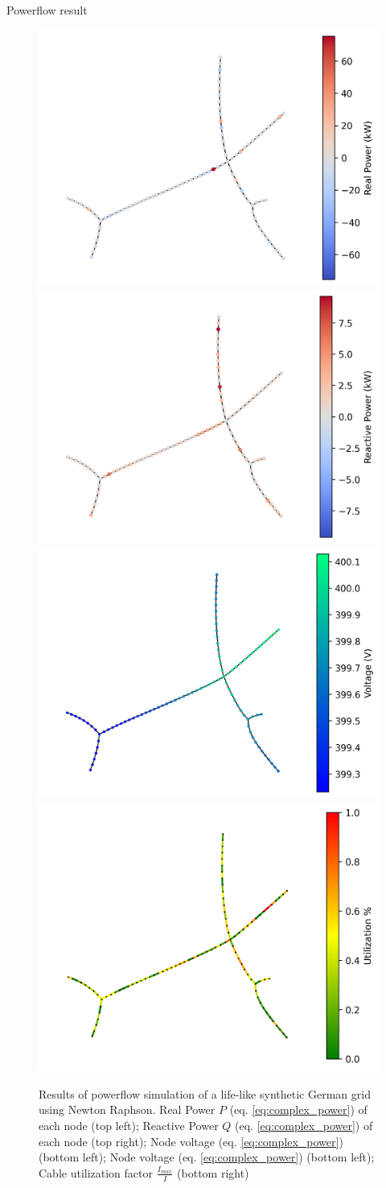 \documentclass[final]{beamer}
\newlength{\colwidth}
\begin{document}
\begin{frame}[t]
\begin{columns}[t]
\begin{column}{\colwidth}
\begin{block}{Powerflow result}
  \begin{figure}
    \includegraphics[width=.48\textwidth]{img/graphs/rural1/power.png}\hfill
    \includegraphics[width=.48\textwidth]{img/graphs/rural1/power_react.png}\hfill
    \\[\smallskipamount]
    \includegraphics[width=.48\textwidth]{img/graphs/rural1/voltage.png}\hfill
    \includegraphics[width=.48\textwidth]{img/graphs/rural1/cable_utilization.png}\hfill
    \caption{Results of powerflow simulation of a life-like synthetic German grid\autocite{en13123290} using Newton Raphson.
      Real Power $P$ (eq. \ref{eq:complex_power}) of each node (top left);
      Reactive Power $Q$ (eq. \ref{eq:complex_power}) of each node (top right);
      Node voltage (eq. \ref{eq:complex_power}) (bottom left);
      Node voltage (eq. \ref{eq:complex_power}) (bottom left);
      Cable utilization factor $\frac{I_{max}}{I}$ (bottom right)
      }\label{fig:foobar}
  \end{figure}  


\end{block}
\end{column}
\end{columns}
\end{frame}
\end{document}
